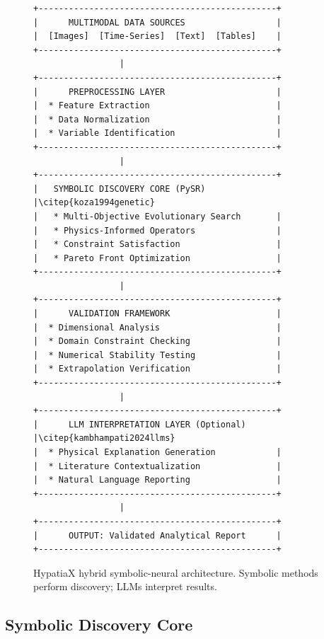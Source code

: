 \documentclass[twoside,11pt]{article}
\begin{document}
\begin{figure}[htbp]
\centering
\begin{small}
\begin{verbatim}
+-----------------------------------------------+
|      MULTIMODAL DATA SOURCES                  |
|  [Images]  [Time-Series]  [Text]  [Tables]    |
+-----------------------------------------------+
                 |
+-----------------------------------------------+
|      PREPROCESSING LAYER                      |
|  * Feature Extraction                         |
|  * Data Normalization                         |
|  * Variable Identification                    |
+-----------------------------------------------+
                 |
+-----------------------------------------------+
|   SYMBOLIC DISCOVERY CORE (PySR)              |\citep{koza1994genetic}
|   * Multi-Objective Evolutionary Search       |
|   * Physics-Informed Operators                |
|   * Constraint Satisfaction                   |
|   * Pareto Front Optimization                 |
+-----------------------------------------------+
                 |
+-----------------------------------------------+
|      VALIDATION FRAMEWORK                     |
|  * Dimensional Analysis                       |
|  * Domain Constraint Checking                 |
|  * Numerical Stability Testing                |
|  * Extrapolation Verification                 |
+-----------------------------------------------+
                 |
+-----------------------------------------------+
|      LLM INTERPRETATION LAYER (Optional)      |\citep{kambhampati2024llms}
|  * Physical Explanation Generation            |
|  * Literature Contextualization               |
|  * Natural Language Reporting                 |
+-----------------------------------------------+
                 |
+-----------------------------------------------+
|      OUTPUT: Validated Analytical Report      |
+-----------------------------------------------+
\end{verbatim}

\end{small}
\caption{HypatiaX hybrid symbolic-neural architecture. Symbolic methods perform discovery; LLMs interpret results.}
\label{fig:architecture}
\end{figure}

\subsection{Symbolic Discovery Core}\citep{koza1994genetic}
\end{document}
